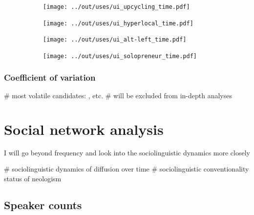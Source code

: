 \documentclass[a4paper]{scrartcl}
\begin{document}
    \begin{figure}
      \caption{Temporal dynamics in usage frequency for case studies.}
      \centering
      \begin{subfigure}{.45\linewidth}
        \caption{}
        \texttt{[image: ../out/uses/ui\_upcycling\_time.pdf]}
      \end{subfigure}
      \begin{subfigure}{.45\linewidth}
        \caption{}
        \texttt{[image: ../out/uses/ui\_hyperlocal\_time.pdf]}
      \end{subfigure}
      \begin{subfigure}{.45\linewidth}
        \caption{}
        \texttt{[image: ../out/uses/ui\_alt-left\_time.pdf]}
      \end{subfigure}
      \begin{subfigure}{.45\linewidth}
        \caption{}
        \texttt{[image: ../out/uses/ui\_solopreneur\_time.pdf]}
      \end{subfigure}
    \end{figure}

    \subsubsection{Coefficient of variation}

      \begin{easylist}[itemize]
        # most volatile candidates: ,  etc.
        # will be excluded from in-depth analyses
      \end{easylist}

\section{Social network analysis}

  I will go beyond frequency and look into the sociolinguistic dynamics more closely

  \begin{easylist}[itemize]
    # sociolinguistic dynamics of diffusion over time
    # sociolinguistic conventionality status of neologism
  \end{easylist}

  \subsection{Speaker counts}
\end{document}
